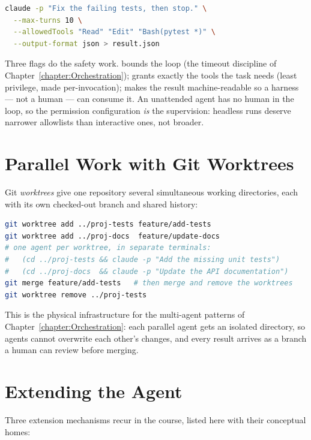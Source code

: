 \begin{lstlisting}[language=bash]
claude -p "Fix the failing tests, then stop." \
  --max-turns 10 \
  --allowedTools "Read" "Edit" "Bash(pytest *)" \
  --output-format json > result.json
\end{lstlisting}

Three flags do the safety work.
 bounds the loop (the timeout discipline of Chapter~\ref{chapter:Orchestration});  grants exactly the tools the task needs (least privilege, made per-invocation);  makes the result machine-readable so a harness --- not a human --- can consume it.
An unattended agent has no human in the loop, so the permission configuration \emph{is} the supervision: headless runs deserve narrower allowlists than interactive ones, not broader.

\section{Parallel Work with Git Worktrees}

Git \emph{worktrees} give one repository several simultaneous working directories, each with its own checked-out branch and shared history:

\begin{lstlisting}[language=bash]
git worktree add ../proj-tests feature/add-tests
git worktree add ../proj-docs  feature/update-docs
# one agent per worktree, in separate terminals:
#   (cd ../proj-tests && claude -p "Add the missing unit tests")
#   (cd ../proj-docs  && claude -p "Update the API documentation")
git merge feature/add-tests   # then merge and remove the worktrees
git worktree remove ../proj-tests
\end{lstlisting}

This is the physical infrastructure for the multi-agent patterns of Chapter~\ref{chapter:Orchestration}: each parallel agent gets an isolated directory, so agents cannot overwrite each other's changes, and every result arrives as a branch a human can review before merging.

\section{Extending the Agent}

Three extension mechanisms recur in the course, listed here with their conceptual homes:

